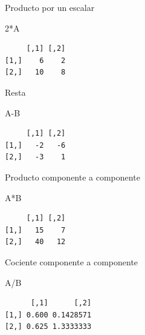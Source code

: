 \documentclass[
  ignorenonframetext,
  aspectratio=169,
  spanish,
]{beamer}
\newenvironment{Shaded}{\begin{snugshade}}{\end{snugshade}}
\newcommand{\DecValTok}[1]{\textcolor[rgb]{0.68,0.00,0.00}{#1}}
\newcommand{\NormalTok}[1]{\textcolor[rgb]{0.00,0.23,0.31}{#1}}
\newcommand{\SpecialCharTok}[1]{\textcolor[rgb]{0.37,0.37,0.37}{#1}}
\begin{document}
\begin{frame}[fragile]{Producto por un escalar}
\label{producto-por-un-escalar}
\begin{Shaded}
\begin{Highlighting}[]
\DecValTok{2}\SpecialCharTok{*}\NormalTok{A}
\end{Highlighting}
\end{Shaded}

\begin{verbatim}
     [,1] [,2]
[1,]    6    2
[2,]   10    8
\end{verbatim}
\end{frame}

\begin{frame}[fragile]{Resta}
\label{resta}
\begin{Shaded}
\begin{Highlighting}[]
\NormalTok{A}\SpecialCharTok{{-}}\NormalTok{B}
\end{Highlighting}
\end{Shaded}

\begin{verbatim}
     [,1] [,2]
[1,]   -2   -6
[2,]   -3    1
\end{verbatim}
\end{frame}

\begin{frame}[fragile]{Producto componente a componente}
\label{producto-componente-a-componente}
\begin{Shaded}
\begin{Highlighting}[]
\NormalTok{A}\SpecialCharTok{*}\NormalTok{B}
\end{Highlighting}
\end{Shaded}

\begin{verbatim}
     [,1] [,2]
[1,]   15    7
[2,]   40   12
\end{verbatim}
\end{frame}

\begin{frame}[fragile]{Cociente componente a componente}
\label{cociente-componente-a-componente}
\begin{Shaded}
\begin{Highlighting}[]
\NormalTok{A}\SpecialCharTok{/}\NormalTok{B}
\end{Highlighting}
\end{Shaded}

\begin{verbatim}
      [,1]      [,2]
[1,] 0.600 0.1428571
[2,] 0.625 1.3333333
\end{verbatim}
\end{frame}
\end{document}
